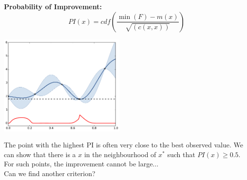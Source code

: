 \documentclass{beamer}
\begin{document}

\begin{frame}{}
\textbf{Probability of Improvement:}
$$PI(x) = cdf \left(\frac{\min(F) - m(x)}{\sqrt{(c(x,x))}} \right)$$
\begin{center}
\includegraphics[height=5cm]{figures/python/ego_PI}
\end{center}
\end{frame}

\begin{frame}{}
The point with the highest PI is often very close to the best observed value. We can show that there is a $x$ in the neighbourhood of $x^*$ such that $PI(x) \geq 0.5$.\\
\vspace{5mm}
For such points, the improvement cannot be large... \\
\vspace{3mm}
Can we find another criterion?
\end{frame}
\end{document}
